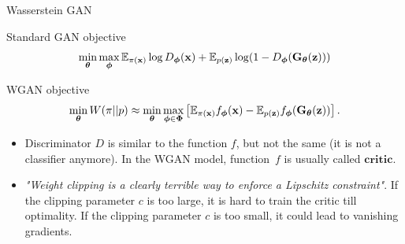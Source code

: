 \begin{frame}{Wasserstein GAN}
	\begin{block}{Standard GAN objective}
		\vspace{-0.2cm}
		\[
		\min_{\boldsymbol{\theta}} \max_{\boldsymbol{\phi}} \mathbb{E}_{\pi(\mathbf{x})} \log D_{\boldsymbol{\phi}}(\mathbf{x}) + \mathbb{E}_{p(\mathbf{z})} \log (1 - D_{\boldsymbol{\phi}}(\mathbf{G}_{\boldsymbol{\theta}}(\mathbf{z})))
		\]
		\vspace{-0.2cm}
	\end{block}
	\begin{block}{WGAN objective}
		\vspace{-0.3cm}
		\[
		\min_{\boldsymbol{\theta}} W(\pi || p) \approx \min_{\boldsymbol{\theta}} \max_{\boldsymbol{\phi} \in \boldsymbol{\Phi}} \left[ \mathbb{E}_{\pi(\mathbf{x})} f_{\boldsymbol{\phi}}(\mathbf{x})  - \mathbb{E}_{p(\mathbf{z})} f_{\boldsymbol{\phi}}(\mathbf{G}_{\boldsymbol{\theta}}(\mathbf{z}))\right].
		\]
		\vspace{-0.3cm}
	\end{block}
	\begin{itemize}
		\item Discriminator $D$ is similar to the function $f$, but not the same (it is not a classifier anymore). In the WGAN model, function~$f$ is usually called $\textbf{critic}$.
		\item \textit{"Weight clipping is a clearly terrible way to enforce a Lipschitz constraint"}. If the clipping parameter $c$ is too large, it is hard to train the critic till optimality. If the clipping parameter $c$ is too small, it could lead to vanishing gradients.
	\end{itemize}
	
\end{frame}
